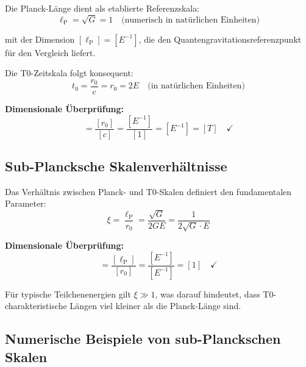 \documentclass[12pt,a4paper]{report}
\newcommand{\lP}{\ell_{\text{P}}}         %
\newcommand{\rzero}{r_0}                  %
\newcommand{\tzero}{t_0}                  %
\begin{document}
	Die Planck-Länge dient als etablierte Referenzskala:
	\begin{equation}
		\lP = \sqrt{G} = 1 \quad \text{(numerisch in natürlichen Einheiten)}
	\end{equation}
	
	mit der Dimension $[\lP] = [E^{-1}]$, die den Quantengravitationsreferenzpunkt für den Vergleich liefert.
	
	Die T0-Zeitskala folgt konsequent:
	\begin{equation}
		\tzero = \frac{\rzero}{c} = \rzero = 2E \quad \text{(in natürlichen Einheiten)}
	\end{equation}
	
	\textbf{Dimensionale Überprüfung:}
	\begin{equation}
		[\tzero] = \frac{[\rzero]}{[c]} = \frac{[E^{-1}]}{[1]} = [E^{-1}] = [T] \quad \checkmark
	\end{equation}
	
	\subsection{Sub-Plancksche Skalenverhältnisse}
	\label{subsec:sub_planckian_ratios}
	
	Das Verhältnis zwischen Planck- und T0-Skalen definiert den fundamentalen Parameter:
	\begin{equation}
		\xi = \frac{\lP}{\rzero} = \frac{\sqrt{G}}{2GE} = \frac{1}{2\sqrt{G} \cdot E}
	\end{equation}
	
	\textbf{Dimensionale Überprüfung:}
	\begin{equation}
		[\xi] = \frac{[\lP]}{[\rzero]} = \frac{[E^{-1}]}{[E^{-1}]} = [1] \quad \checkmark
	\end{equation}
	
	Für typische Teilchenenergien gilt $\xi \gg 1$, was darauf hindeutet, dass T0-charakteristische Längen viel kleiner als die Planck-Länge sind.
	
	\subsection{Numerische Beispiele von sub-Planckschen Skalen}
	\label{subsec:numerical_sub_planckian}
	
\end{document}
